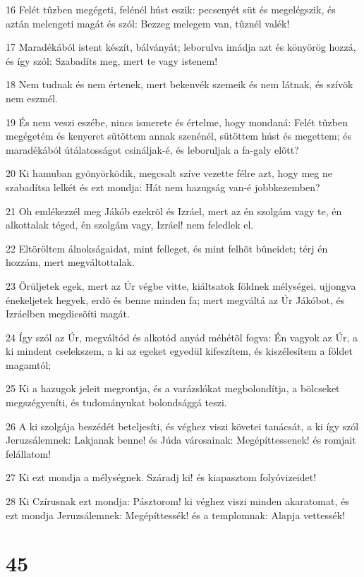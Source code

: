 \par 16 Felét tûzben megégeti, felénél húst eszik: pecsenyét süt és megelégszik, és aztán melengeti magát és szól: Bezzeg melegem van, tûznél valék!
\par 17 Maradékából istent készít, bálványát; leborulva imádja azt és könyörög hozzá, és így szól: Szabadíts meg, mert te vagy istenem!
\par 18 Nem tudnak és nem értenek, mert bekenvék szemeik és nem látnak, és szívök nem eszmél.
\par 19 És nem veszi eszébe, nincs ismerete és értelme, hogy mondaná: Felét tûzben megégetém és kenyeret sütöttem annak szenénél, sütöttem húst és megettem; és maradékából útálatosságot csináljak-é, és leboruljak a fa-galy elõtt?
\par 20 Ki hamuban gyönyörködik, megcsalt szíve vezette félre azt, hogy meg ne szabadítsa lelkét és ezt mondja: Hát nem hazugság van-é jobbkezemben?
\par 21 Oh emlékezzél meg Jákób ezekrõl és Izráel, mert az én szolgám vagy te, én alkottalak téged, én szolgám vagy, Izráel! nem feledlek el.
\par 22 Eltöröltem álnokságaidat, mint felleget, és mint felhõt bûneidet; térj én hozzám, mert megváltottalak.
\par 23 Örüljetek egek, mert az Úr végbe vitte, kiáltsatok földnek mélységei, ujjongva énekeljetek hegyek, erdõ és benne minden fa; mert megváltá az Úr Jákóbot, és Izráelben megdicsõíti magát.
\par 24 Így szól az Úr, megváltód és alkotód anyád méhétõl fogva: Én vagyok az Úr, a ki mindent cselekszem, a ki az egeket egyedül kifeszítem, és kiszélesítem a földet magamtól;
\par 25 Ki a hazugok jeleit megrontja, és a varázslókat megbolondítja, a bölcseket megszégyeníti, és tudományukat bolondsággá teszi.
\par 26 A ki szolgája beszédét beteljesíti, és véghez viszi követei tanácsát, a ki így szól Jeruzsálemnek: Lakjanak benne! és Júda városainak: Megépíttessenek! és romjait felállatom!
\par 27 Ki ezt mondja a mélységnek. Száradj ki! és kiapasztom folyóvizeidet!
\par 28 Ki Czírusnak ezt mondja: Pásztorom! ki véghez viszi minden akaratomat, és ezt mondja Jeruzsálemnek: Megépíttessék! és a templomnak: Alapja vettessék!

\chapter{45}

